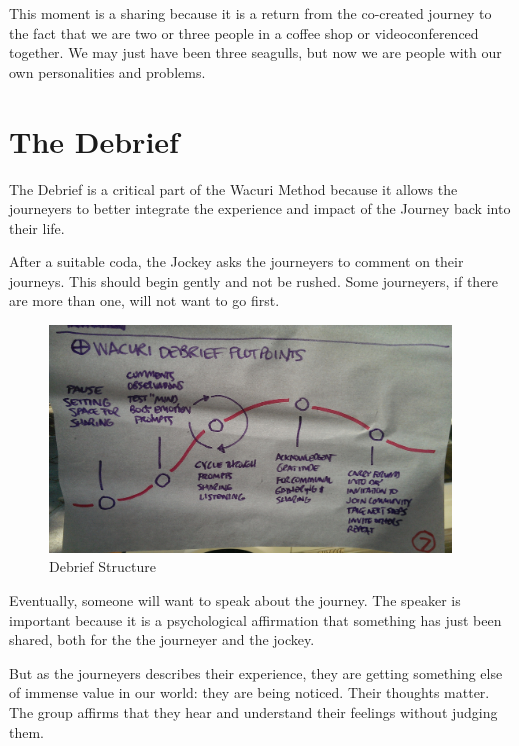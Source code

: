 \documentclass[12pt]{book}
\begin{document}
This moment is a sharing because it is a return from the co-created journey to the fact that we are two or three people in a coffee shop or videoconferenced together. We may just have been three seagulls, but now we are people with our own personalities and problems.
				
			
		




\chapter{The Debrief}

The Debrief is a critical part of the Wacuri Method because it allows the journeyers to better integrate the experience and impact of the Journey back into their life.
					
After a suitable coda, the Jockey asks the journeyers to comment on their journeys. This should begin gently and not be rushed. Some journeyers, if there are more than one, will not want to go first.

\begin{figure}
  \centering
     \includegraphics[width=0.95\textwidth]{WacuriFigures/DebriefStructure.jpg}
     \caption{Debrief Structure}
  \label{fig:debrief}     
\end{figure}

Eventually, someone will want to speak about the journey. The speaker is important because it is a psychological affirmation that something has just been shared, both for the the journeyer and the jockey.
					
But as the journeyers describes their experience, they are getting something else of immense value in our world: they are being noticed. Their thoughts matter. The group affirms that they hear and understand their feelings without judging them.
					
\end{document}
